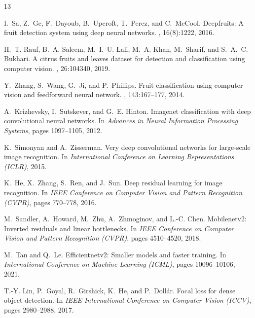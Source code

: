 \documentclass[10pt,twocolumn,letterpaper]{article}
\begin{document}
\clearpage
\twocolumn

{\small

\begin{thebibliography}{13}

I.~Sa, Z.~Ge, F.~Dayoub, B.~Upcroft, T.~Perez, and C.~McCool.
\newblock Deepfruits: A fruit detection system using deep neural networks.
, 16(8):1222, 2016.

H.~T. Rauf, B.~A. Saleem, M.~I.~U. Lali, M.~A. Khan, M.~Sharif, and S.~A.~C. Bukhari.
\newblock A citrus fruits and leaves dataset for detection and classification using computer vision.
, 26:104340, 2019.

Y.~Zhang, S.~Wang, G.~Ji, and P.~Phillips.
\newblock Fruit classification using computer vision and feedforward neural network.
, 143:167--177, 2014.

A.~Krizhevsky, I.~Sutskever, and G.~E. Hinton.
\newblock Imagenet classification with deep convolutional neural networks.
\newblock In {\em Advances in Neural Information Processing Systems}, pages 1097--1105, 2012.

K.~Simonyan and A.~Zisserman.
\newblock Very deep convolutional networks for large-scale image recognition.
\newblock In {\em International Conference on Learning Representations (ICLR)}, 2015.

K.~He, X.~Zhang, S.~Ren, and J.~Sun.
\newblock Deep residual learning for image recognition.
\newblock In {\em IEEE Conference on Computer Vision and Pattern Recognition (CVPR)}, pages 770--778, 2016.

M.~Sandler, A.~Howard, M.~Zhu, A.~Zhmoginov, and L.-C. Chen.
\newblock Mobilenetv2: Inverted residuals and linear bottlenecks.
\newblock In {\em IEEE Conference on Computer Vision and Pattern Recognition (CVPR)}, pages 4510--4520, 2018.

M.~Tan and Q.~Le.
\newblock Efficientnetv2: Smaller models and faster training.
\newblock In {\em International Conference on Machine Learning (ICML)}, pages 10096--10106, 2021.

T.-Y. Lin, P.~Goyal, R.~Girshick, K.~He, and P.~Doll{\'a}r.
\newblock Focal loss for dense object detection.
\newblock In {\em IEEE International Conference on Computer Vision (ICCV)}, pages 2980--2988, 2017.


\end{thebibliography}}
\end{document}
